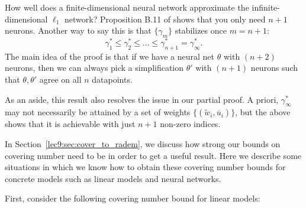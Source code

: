 \begin{remark}
How well does a finite-dimensional neural network approximate the infinite-dimensional $\ell_1$ network? Proposition B.11 of \cite{wei2020regularization} shows that you only need $n+1$ neurons. Another way to say this is that $\{\gamma_m\}$ stabilizes once $m=n+1$:
\begin{equation}
\gamma_1^* \le \gamma_2^* \le \dots \le \gamma_{n+1}^* = \gamma_\infty^*.
\end{equation}
The main idea of the proof is that if we have a neural net $\theta$ with $(n+2)$ neurons, then we can always pick a simplification $\theta'$ with $(n+1)$ neurons such that $\theta,\theta'$ agree on all $n$ datapoints.

As an aside, this result also resolves the issue in our partial proof. A priori, $\gamma_{\infty}^*$ may not necessarily be attained by a set of weights $\{(\widetilde w_i, \overline u_i)\}$, but the above shows that it is achievable with just $n+1$ non-zero indices.

\end{remark}


\label{sec:deep_nets}
In Section~\ref{lec9:sec:cover_to_radem}, we discuss how strong our bounds on covering number need to be in order to get a useful result. 
Here we describe some situations in which we know how to obtain these covering number bounds for concrete models such as linear models and neural networks. 

First, consider the following covering number bound for linear models:

